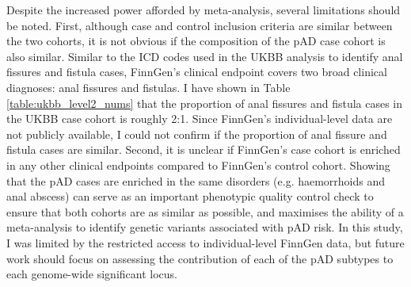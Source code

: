 Despite the increased power afforded by meta-analysis, several limitations should be noted. First, although case and control inclusion criteria are similar between the two cohorts, it is not obvious if the composition of the pAD case cohort is also similar. Similar to the ICD codes used in the UKBB analysis to identify anal fissures and fistula cases, FinnGen's clinical endpoint covers two broad clinical diagnoses: anal fissures and fistulas. I have shown in Table \ref{table:ukbb_level2_nums} that the proportion of anal fissures and fistula cases in the UKBB case cohort is roughly 2:1. Since FinnGen's individual-level data are not publicly available, I could not confirm if the proportion of anal fissure and fistula cases are similar. Second, it is unclear if FinnGen's case cohort is enriched in any other clinical endpoints compared to FinnGen's control cohort. Showing that the pAD cases are enriched in the same disorders (e.g. haemorrhoids and anal abscess) can serve as an important phenotypic quality control check to ensure that both cohorts are as similar as possible, and maximises the ability of a meta-analysis to identify genetic variants associated with pAD risk. In this study, I was limited by the restricted access to individual-level FinnGen data, but future work should focus on assessing the contribution of each of the pAD subtypes to each genome-wide significant locus.\\


